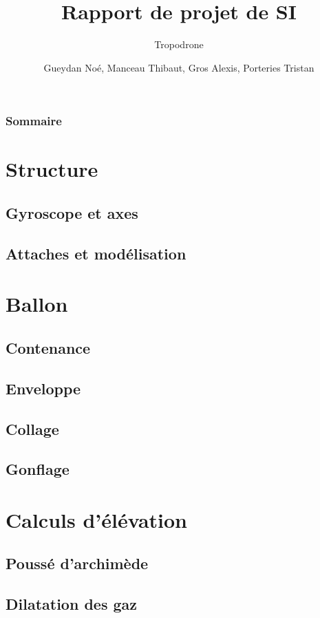 \documentclass{beamer}
\title{Rapport de projet de SI}
\subtitle{Tropodrone}
\author{Gueydan Noé, Manceau Thibaut, Gros Alexis, Porteries Tristan}
\begin{document}
\begin{frame}
  \titlepage
\end{frame}

\begin{frame}
    \frametitle{Sommaire}
    \begin{multicols}{2}
      {
		\setcounter{tocdepth}{1}
        \tableofcontents
      }
    \end{multicols}
\end{frame}

\section{Structure}

\subsection{Gyroscope et axes}
\subsection{Attaches et modélisation}

\section{Ballon}

\subsection{Contenance}
\subsection{Enveloppe}
\subsection{Collage}
\subsection{Gonflage}

\section{Calculs d'élévation}

\subsection{Poussé d'archimède}
\subsection{Dilatation des gaz}
\end{document}
